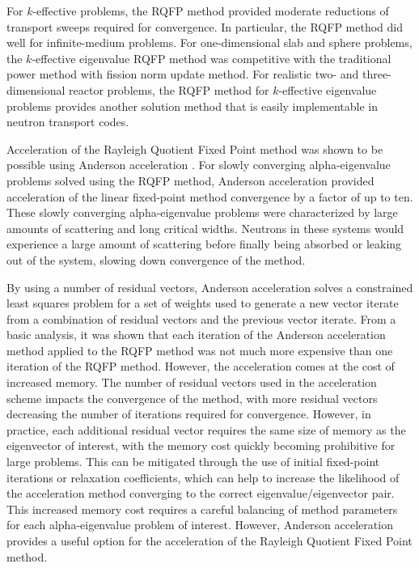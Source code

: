 For $k$-effective problems, the RQFP method provided moderate reductions of transport sweeps required for convergence. In particular, the RQFP method did well for infinite-medium problems. For one-dimensional slab and sphere problems, the $k$-effective eigenvalue RQFP method was competitive with the traditional power method with fission norm update method. For realistic two- and three-dimensional reactor problems, the RQFP method for $k$-effective eigenvalue problems provides another solution method that is easily implementable in neutron transport codes.

Acceleration of the Rayleigh Quotient Fixed Point method was shown to be possible using Anderson acceleration \cite{walker_anderson_2011}. For slowly converging alpha-eigenvalue problems solved using the RQFP method, Anderson acceleration provided acceleration of the linear fixed-point method convergence by a factor of up to ten. These slowly converging alpha-eigenvalue problems were characterized by large amounts of scattering and long critical widths. Neutrons in these systems would experience a large amount of scattering before finally being absorbed or leaking out of the system, slowing down convergence of the method.

By using a number of residual vectors, Anderson acceleration solves a constrained least squares problem for a set of weights used to generate a new vector iterate from a combination of residual vectors and the previous vector iterate. From a basic analysis, it was shown that each iteration of the Anderson acceleration method applied to the RQFP method was not much more expensive than one iteration of the RQFP method. However, the acceleration comes at the cost of increased memory.  The number of residual vectors used in the acceleration scheme impacts the convergence of the method, with more residual vectors decreasing the number of iterations required for convergence. However, in practice, each additional residual vector requires the same size of memory as the eigenvector of interest, with the memory cost quickly becoming prohibitive for large problems. This can be mitigated through the use of initial fixed-point iterations or relaxation coefficients, which can help to increase the likelihood of the acceleration method converging to the correct eigenvalue/eigenvector pair. This increased memory cost requires a careful balancing of method parameters for each alpha-eigenvalue problem of interest. However, Anderson acceleration provides a useful option for the acceleration of the Rayleigh Quotient Fixed Point method.

